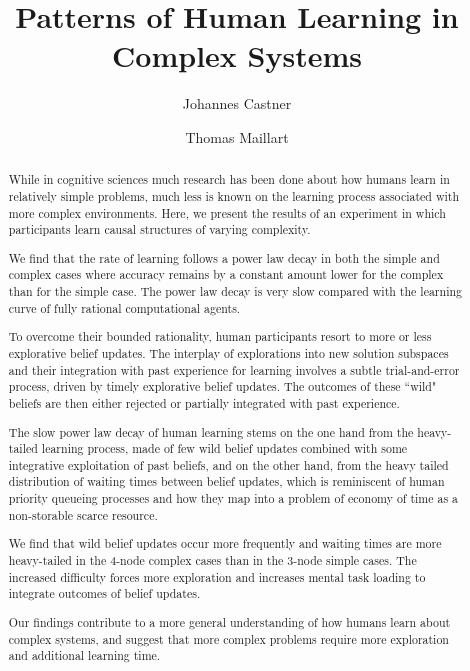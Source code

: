 \documentclass{article}
\begin{document}
\title{Patterns of Human Learning in Complex Systems} 
\author{Johannes Castner}
\author{Thomas Maillart}

\begin{abstract} 
While in cognitive sciences much research has been done about how humans learn in relatively simple problems, much less is known on the learning process associated with more complex environments. Here, we present the results of an experiment in which participants learn causal structures of varying complexity.

We find that the rate of learning follows a power law decay in both the simple and complex cases where accuracy remains by a constant amount lower for the complex than for the simple case. The power law decay is very slow compared with the learning curve of fully rational computational agents.

To overcome their bounded rationality, human participants resort to more or less explorative belief updates. The interplay of explorations into new solution subspaces and their integration with past experience for learning involves a subtle trial-and-error process, driven by timely explorative belief updates. The outcomes of these ``wild" beliefs are then either rejected or partially integrated with past experience.

The slow power law decay of human learning stems on the one hand from the heavy-tailed learning process, made of few wild belief updates combined with some integrative exploitation of past beliefs, and on the other hand, from the heavy tailed distribution of waiting times between belief updates, which is reminiscent of human priority queueing processes and how they map into a problem of economy of time as a non-storable scarce resource.

We find that wild belief updates occur more frequently and waiting times are more heavy-tailed in the 4-node complex cases than in the 3-node simple cases. The increased difficulty forces more exploration and increases mental task loading to integrate outcomes of belief updates.

Our findings contribute to a more general understanding of how humans learn about complex systems, and suggest that more complex problems require more exploration and additional learning time.
\end{abstract}


\end{document}
